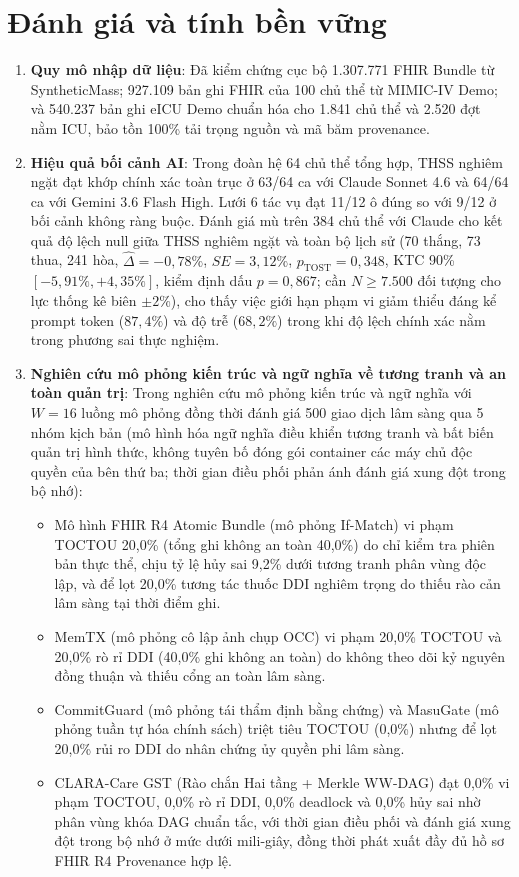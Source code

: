 \documentclass[10pt]{article}
\begin{document}
\section{Đánh giá và tính bền vững}
\begin{enumerate}[leftmargin=*]
\item \textbf{Quy mô nhập dữ liệu}: Đã kiểm chứng cục bộ 1.307.771 FHIR Bundle từ SyntheticMass; 927.109 bản ghi FHIR của 100 chủ thể từ MIMIC-IV Demo; và 540.237 bản ghi eICU Demo chuẩn hóa cho 1.841 chủ thể và 2.520 đợt nằm ICU, bảo tồn 100\% tải trọng nguồn và mã băm provenance.
\item \textbf{Hiệu quả bối cảnh AI}: Trong đoàn hệ 64 chủ thể tổng hợp, THSS nghiêm ngặt đạt khớp chính xác toàn trục ở 63/64 ca với Claude Sonnet 4.6 và 64/64 ca với Gemini 3.6 Flash High. Lưới 6 tác vụ đạt 11/12 ô đúng so với 9/12 ở bối cảnh không ràng buộc. Đánh giá mù trên 384 chủ thể với Claude cho kết quả độ lệch null giữa THSS nghiêm ngặt và toàn bộ lịch sử (70 thắng, 73 thua, 241 hòa, $\hat{\Delta} = -0{,}78\%$, $SE = 3{,}12\%$, $p_{\text{TOST}} = 0{,}348$, KTC 90\% $[-5{,}91\%, +4{,}35\%]$, kiểm định dấu $p=0{,}867$; cần $N \ge 7.500$ đối tượng cho lực thống kê biên $\pm 2\%$), cho thấy việc giới hạn phạm vi giảm thiểu đáng kể prompt token ($87{,}4\%$) và độ trễ ($68{,}2\%$) trong khi độ lệch chính xác nằm trong phương sai thực nghiệm.
\item \textbf{Nghiên cứu mô phỏng kiến trúc và ngữ nghĩa về tương tranh và an toàn quản trị}:
Trong nghiên cứu mô phỏng kiến trúc và ngữ nghĩa với $W=16$ luồng mô phỏng đồng thời đánh giá 500 giao dịch lâm sàng qua 5 nhóm kịch bản (mô hình hóa ngữ nghĩa điều khiển tương tranh và bất biến quản trị hình thức, không tuyên bố đóng gói container các máy chủ độc quyền của bên thứ ba; thời gian điều phối phản ánh đánh giá xung đột trong bộ nhớ):
\begin{itemize}[nosep]
\item Mô hình FHIR R4 Atomic Bundle (mô phỏng If-Match) vi phạm TOCTOU 20,0\% (tổng ghi không an toàn 40,0\%) do chỉ kiểm tra phiên bản thực thể, chịu tỷ lệ hủy sai 9,2\% dưới tương tranh phân vùng độc lập, và để lọt 20,0\% tương tác thuốc DDI nghiêm trọng do thiếu rào cản lâm sàng tại thời điểm ghi.
\item MemTX (mô phỏng cô lập ảnh chụp OCC) vi phạm 20,0\% TOCTOU và 20,0\% rò rỉ DDI (40,0\% ghi không an toàn) do không theo dõi kỷ nguyên đồng thuận và thiếu cổng an toàn lâm sàng.
\item CommitGuard (mô phỏng tái thẩm định bằng chứng) và MasuGate (mô phỏng tuần tự hóa chính sách) triệt tiêu TOCTOU (0,0\%) nhưng để lọt 20,0\% rủi ro DDI do nhân chứng ủy quyền phi lâm sàng.
\item CLARA-Care GST (Rào chắn Hai tầng + Merkle WW-DAG) đạt 0,0\% vi phạm TOCTOU, 0,0\% rò rỉ DDI, 0,0\% deadlock và 0,0\% hủy sai nhờ phân vùng khóa DAG chuẩn tắc, với thời gian điều phối và đánh giá xung đột trong bộ nhớ ở mức dưới mili-giây, đồng thời phát xuất đầy đủ hồ sơ FHIR R4 Provenance hợp lệ.
\end{itemize}
\end{enumerate}
\end{document}
